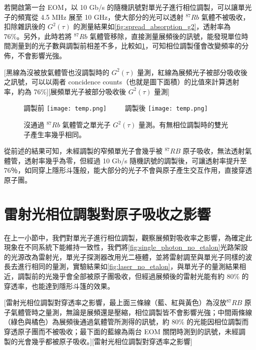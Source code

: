 \documentclass[class=NCU_thesis, crop=false]{standalone}
\begin{document}
若開啟第一台 EOM，以 10 Gb/s 的隨機訊號對單光子進行相位調製，可以讓單光子的頻寬從 4.5 MHz 展至 10 GHz，使大部分的光可以透射 $^{87}Rb$ 氣體不被吸收，扣除雜訊後的 $G^2(\tau)$ 的測量結果如\cref{fig:spread_absorption_g2}，透射率為 76\%。另外，此時若將 $^{87}Rb$ 氣體管移除，直接測量展頻後的訊號，能發現單位時間測量到的光子數與調製前相差不多，比較如\cref{fig:spread_or_not}，可知相位調製僅會改變頻率的分佈，不會影響光強。

[黑線為沒被放氣體管也沒調製時的 $G^{2}(\tau)$ 量測，紅線為展頻光子被部分吸收後之訊號，可以以兩者 concidence counts（也就是圖下面積）的比值來計算透射率，約為 76\%][展頻單光子被部分吸收後 $G^{2}(\tau)$ 量測]

\begin{figure}[!hbt]
    \centering
    \subcaptionbox
        {調製前 
        \label{fig:subfig_fig1}}
        {\texttt{[image: temp.png]}}
    ~~~~
    \subcaptionbox
        {調製後
        \label{fig:subfig_fig2}}
        {\texttt{[image: temp.png]}}
    \caption{沒通過 $^{87}Rb$ 氣體管之單光子 $G^{2}(\tau)$ 量測。有無相位調製時的雙光子產生率幾乎相同。}
    \label{fig:spread_or_not}
\end{figure}

從前述的結果可知，未經調製的窄頻單光子會幾乎被 $^{87}RB$ 原子吸收，無法透射氣體管，透射率幾乎為零，但經過 10 Gb/s 隨機訊號的調製後，可讓透射率提升至 76％，如同穿上隱形斗篷般，能大部分的光子不會與原子產生交互作用，直接穿透原子團。

\section{雷射光相位調製對原子吸收之影響}
在上一小節中，我們對單光子進行相位調製，觀察展頻對吸收率之影響，為確定此現象在不同系統下能維持一致性，我們將\cref{fig:single_photon_no_etalon}光路架設的光源改為雷射光，單光子探測器改用光二極體，並將雷射調至與單光子同樣的波長去進行相同的量測，實驗結果如\cref{fig:laser_no_etalon}，與單光子的量測結果相近，調製前的光幾乎會全部被原子團吸收，但經過展頻後的雷射光能有約 80\% 的穿透率，也能達到隱形斗篷的效果。

[雷射光相位調製對穿透率之影響，最上面三條線（藍、紅與黃色）為沒放$^{87}RB$ 原子氣體管時之量測，無論是展頻還是壓縮，相位調製皆不會影響光強；中間兩條線（綠色與橘色）為展頻後通過氣體管所測得的訊號，約 80\% 的光能因相位調製而穿透原子團而不被吸收；最下面的藍線為兩台 EOM 關閉時測到的訊號，未經調製的光會幾乎都被原子吸收。][雷射光相位調製對穿透率之影響]
\end{document}
